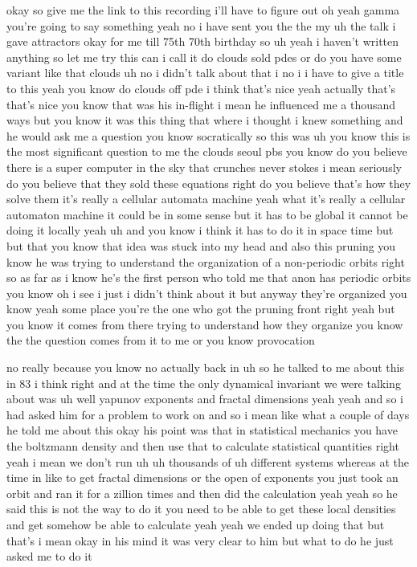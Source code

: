 \begin{description}
okay so give me the link to this recording i'll have to figure out oh yeah gamma you're going to say something yeah no i have sent you the the my uh the talk i gave attractors okay for me till 75th 70th birthday so uh yeah i haven't written anything so let me try this can i call it do clouds sold pdes or do you have some variant like that clouds uh no i didn't talk about that i no i i have to give a title to this yeah you know do clouds off pde i think that's nice yeah actually that's that's nice you know that was his in-flight i mean he influenced me a thousand ways but you know it was this thing that where i thought i knew something and he would ask me a question you know socratically so this was uh you know this is the most significant question to me the clouds seoul pbs you know do you believe there is a super computer in the sky that crunches never stokes i mean seriously do you believe that they sold these equations right do you believe that's how they solve them it's really a cellular automata machine yeah what it's really a cellular automaton machine it could be in some sense but it has to be global it cannot be doing it locally yeah uh and you know i think it has to do it in space time but but that you know that idea was stuck into my head and also this pruning you know he was trying to understand the organization of a non-periodic orbits right so as far as i know he's the first person who told me that anon has periodic orbits you know oh i see i just i didn't think about it but anyway they're organized you know yeah some place you're the one who got the pruning front right yeah but you know it comes from there trying to understand how they organize you know the the question comes from it to me or you know provocation

no really because you know no actually back in uh so he talked to me about this in 83 i think right and at the time the only dynamical invariant we were talking about was uh well yapunov exponents and fractal dimensions yeah yeah and so i had asked him for a problem to work on and so i mean like what a couple of days he told me about this okay his point was that in statistical mechanics you have the boltzmann density and then use that to calculate statistical quantities right yeah i mean we don't run uh uh thousands of uh different systems whereas at the time in like to get fractal dimensions or the open of exponents you just took an orbit and ran it for a zillion times and then did the calculation yeah yeah so he said this is not the way to do it you need to be able to get these local densities and get somehow be able to calculate yeah yeah we ended up doing that but that's i mean okay in his mind it was very clear to him but what to do he just asked me to do it


\end{description}
